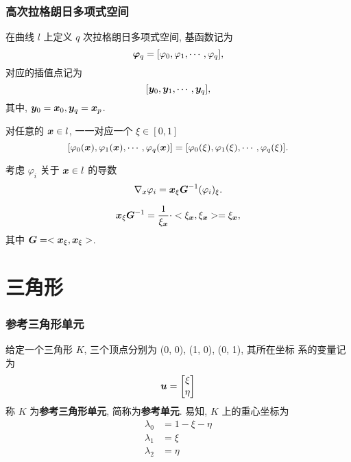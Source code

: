 \documentclass{beamer}
\numberwithin{subsection}{section}
\begin{document}
\begin{frame}
    \frametitle{高次拉格朗日多项式空间}
    在曲线 $l$ 上定义 $q$ 次拉格朗日多项式空间, 基函数记为
    $$
        {\bm \varphi}_q = [\varphi_0, \varphi_1, \cdots, \varphi_q],
    $$
    对应的插值点记为
    $$
        [{\boldsymbol y}_0, {\boldsymbol y}_1, \cdots, {\boldsymbol y}_q],
    $$
    其中, ${\boldsymbol y}_0={\boldsymbol x}_0, {\boldsymbol y}_q={\boldsymbol x}_p$.
\end{frame}

\begin{frame}
    对任意的 ${\boldsymbol x} \in l$, 一一对应一个 $\xi \in [0, 1]$
    $$
        [\varphi_0({\boldsymbol x}), \varphi_1({\boldsymbol x}), \cdots, \varphi_q({\boldsymbol x})] = 
        [\varphi_0(\xi), \varphi_1(\xi), \cdots, \varphi_q(\xi)].
    $$

    考虑 $\varphi_i$ 关于 ${\boldsymbol x} \in l$ 的导数
    \begin{equation*}
        \nabla_x \varphi_i = {\boldsymbol x}_\xi {\boldsymbol G}^{-1}(\varphi_i)_\xi.
    \end{equation*}
    \begin{remark}
        $$
            {\boldsymbol x}_\xi {\boldsymbol G}^{-1} = \frac{1}{\xi_{\boldsymbol x}} \cdot <\xi_{\boldsymbol x}, \xi_{\boldsymbol x}> 
            =\xi_{\boldsymbol x},
        $$
        其中 ${\boldsymbol G} = <{\boldsymbol x}_\xi, {\boldsymbol x}_\xi>$.
    \end{remark}
\end{frame}




\section{三角形}

\begin{frame}
    \frametitle{参考三角形单元}
    给定一个三角形 $K$, 三个顶点分别为 (0, 0), (1, 0), (0, 1), 其所在坐标
    系的变量记为
    $$
        {\boldsymbol u} = \begin{bmatrix}
            \xi \\ \eta
        \end{bmatrix}
    $$
    称 $K$ 为{\bf 参考三角形单元}, 简称为{\bf 参考单元}.  易知, $K$ 上的重心坐标为
    \begin{align*}
        \lambda_0 &= 1 - \xi - \eta\\
        \lambda_1 &= \xi\\
        \lambda_2 &= \eta\\
    \end{align*}
\end{frame}
\end{document}
